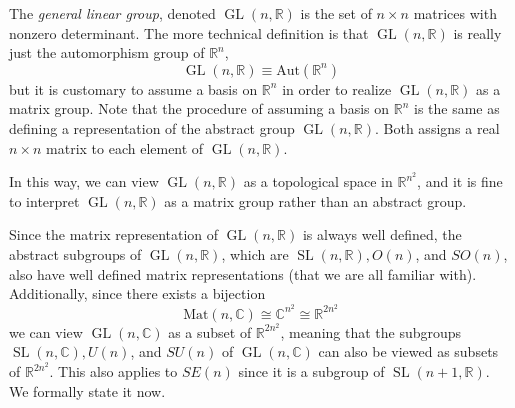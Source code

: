 \documentclass{article}
\DeclareMathOperator{\GL}{GL}
\DeclareMathOperator{\SL}{SL}
\begin{document}
    \begin{definition}
      The \textit{general linear group}, denoted $\GL(n, \mathbb{R})$ is the set of $n \times n$ matrices with nonzero determinant. The more technical definition is that $\GL(n, \mathbb{R})$ is really just the automorphism group of $\mathbb{R}^n$, 
      \begin{equation}
        \GL(n, \mathbb{R}) \equiv \text{Aut}(\mathbb{R}^n)
      \end{equation}
      but it is customary to assume a basis on $\mathbb{R}^n$ in order to realize $\GL(n, \mathbb{R})$ as a matrix group. Note that the procedure of assuming a basis on $\mathbb{R}^n$ is the same as defining a representation of the abstract group $\GL(n, \mathbb{R})$. Both assigns a real $n \times n$ matrix to each element of $\GL(n, \mathbb{R})$. 
    \end{definition}

    In this way, we can view $\GL(n, \mathbb{R})$ as a topological space in $\mathbb{R}^{n^2}$, and it is fine to interpret $\GL(n, \mathbb{R})$ as a matrix group rather than an abstract group. 

    Since the matrix representation of $\GL(n, \mathbb{R})$ is always well defined, the abstract subgroups of $\GL(n, \mathbb{R})$, which are $\SL(n, \mathbb{R}), O(n)$, and $SO(n)$, also have well defined matrix representations (that we are all familiar with). Additionally, since there exists a bijection
    \begin{equation}
      \text{Mat}(n, \mathbb{C}) \cong \mathbb{C}^{n^2} \cong \mathbb{R}^{2 n^2}
    \end{equation}
    we can view $\GL(n, \mathbb{C})$ as a subset of $\mathbb{R}^{2n^2}$, meaning that the subgroups $\SL(n, \mathbb{C}), U(n)$, and $SU(n)$ of $\GL(n, \mathbb{C})$ can also be viewed as subsets of $\mathbb{R}^{2n^2}$. This also applies to $SE(n)$ since it is a subgroup of $\SL(n+1, \mathbb{R})$. We formally state it now. 
\end{document}
